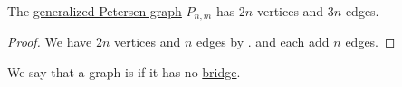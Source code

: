 \begin{proposition}\label{thm:petersen_graph_cardinality}
  The \hyperref[def:petersen_graph]{generalized Petersen graph} \( P_{n,m} \) has \( 2n \) vertices and \( 3n \) edges.
\end{proposition}
\begin{proof}
  We have \( 2n \) vertices and \( n \) edges by .  and  each add \( n \) edges.
\end{proof}

\begin{definition}\label{def:bridgeless_graph}\mimprovised
  We say that a graph is  if it has no \hyperref[def:graph_bridge]{bridge}.
\end{definition}

